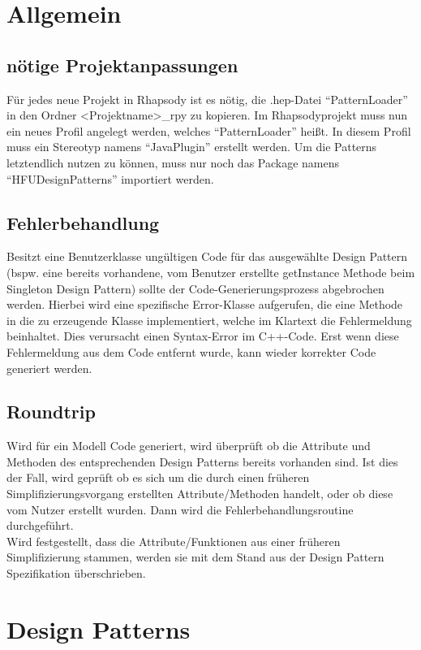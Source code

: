 \chapter{Allgemein}

\section{nötige Projektanpassungen}
Für jedes neue Projekt in Rhapsody ist es nötig, die .hep-Datei \enquote{PatternLoader} in den Ordner <Projektname>_rpy zu kopieren. Im Rhapsodyprojekt muss nun ein neues Profil angelegt werden, welches \enquote{PatternLoader} heißt. In diesem Profil muss ein Stereotyp namens \enquote{JavaPlugin} erstellt werden. Um die Patterns letztendlich nutzen zu können, muss nur noch das Package namens \enquote{HFUDesignPatterns} importiert werden.

\section{Fehlerbehandlung}
Besitzt eine Benutzerklasse ungültigen Code für das ausgewählte Design Pattern (bspw. eine 
bereits vorhandene, vom Benutzer erstellte getInstance Methode beim Singleton Design Pattern) 
sollte der Code-Generierungsprozess abgebrochen werden. Hierbei wird eine spezifische Error-Klasse aufgerufen, die eine Methode in die zu erzeugende Klasse implementiert, welche im Klartext die Fehlermeldung beinhaltet. Dies verursacht einen Syntax-Error im C++-Code. Erst wenn diese Fehlermeldung aus dem Code entfernt wurde, kann wieder korrekter Code generiert werden.

\section{Roundtrip}

Wird für ein Modell Code generiert, wird überprüft ob die Attribute und Methoden des entsprechenden Design Patterns bereits vorhanden sind. Ist dies der Fall, wird geprüft ob es sich um die durch einen früheren Simplifizierungsvorgang erstellten Attribute/Methoden handelt, oder ob diese vom Nutzer erstellt wurden. Dann wird die Fehlerbehandlungsroutine durchgeführt. \\
Wird festgestellt, dass die Attribute/Funktionen aus einer früheren Simplifizierung stammen, werden sie mit dem Stand aus der Design Pattern Spezifikation überschrieben.

\chapter{Design Patterns}

